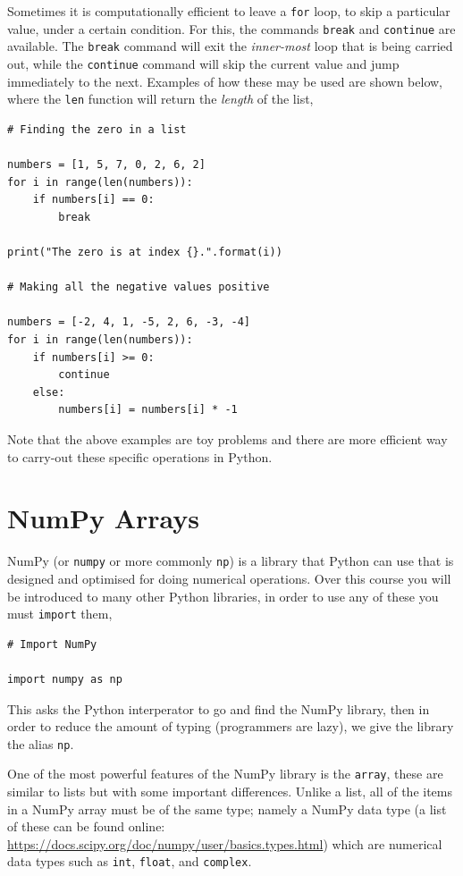 \documentclass[a4paper]{article}
\begin{document}
Sometimes it is computationally efficient to leave a \texttt{for} loop, to skip a particular value, under a certain condition.
For this, the commands \texttt{break} and \texttt{continue} are available.
The \texttt{break} command will exit the \emph{inner-most} loop that is being carried out, while the \texttt{continue} command will skip the current value and jump immediately to the next.
Examples of how these may be used are shown below, where the \texttt{len} function will return the \emph{length} of the list,
\begin{lstlisting}
# Finding the zero in a list

numbers = [1, 5, 7, 0, 2, 6, 2]
for i in range(len(numbers)):
	if numbers[i] == 0:
		break

print("The zero is at index {}.".format(i))

# Making all the negative values positive

numbers = [-2, 4, 1, -5, 2, 6, -3, -4]
for i in range(len(numbers)):
	if numbers[i] >= 0:
		continue
	else:
		numbers[i] = numbers[i] * -1
\end{lstlisting}
Note that the above examples are toy problems and there are more efficient way to carry-out these specific operations in Python.

\section{NumPy Arrays}

NumPy (or \texttt{numpy} or more commonly \texttt{np}) is a library that Python can use that is designed and optimised for doing numerical operations.\cite{numpy}
Over this course you will be introduced to many other Python libraries, in order to use any of these you must \texttt{import} them,
\begin{lstlisting}
# Import NumPy

import numpy as np
\end{lstlisting}
This asks the Python interperator to go and find the NumPy library, then in order to reduce the amount of typing (programmers are lazy), we give the library the alias \texttt{np}.

One of the most powerful features of the NumPy library is the \texttt{array}, these are similar to lists but with some important differences.
Unlike a list, all of the items in a NumPy array must be of the same type; namely a NumPy data type (a list of these can be found online: \url{https://docs.scipy.org/doc/numpy/user/basics.types.html}) which are numerical data types such as \texttt{int}, \texttt{float}, and \texttt{complex}.
\end{document}
